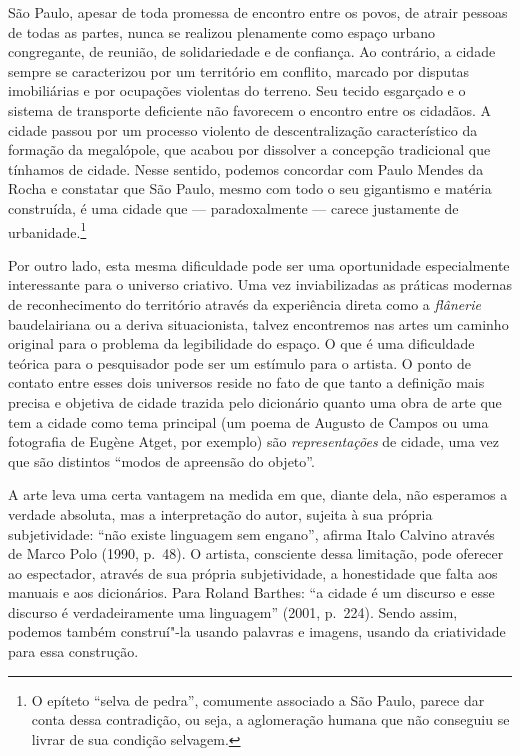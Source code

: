 São Paulo, apesar de toda promessa de encontro entre os povos, de atrair
pessoas de todas as partes, nunca se realizou plenamente como espaço
urbano congregante, de reunião, de solidariedade e de confiança. Ao
contrário, a cidade sempre se caracterizou por um território em
conflito, marcado por disputas imobiliárias e por ocupações violentas do
terreno. Seu tecido esgarçado e o sistema de transporte deficiente não
favorecem o encontro entre os cidadãos. A cidade passou por um processo
violento de descentralização característico da formação da megalópole,
que acabou por dissolver a concepção tradicional que tínhamos de cidade.
Nesse sentido, podemos concordar com Paulo Mendes da Rocha e constatar
que São Paulo, mesmo com todo o seu gigantismo e matéria construída, é
uma cidade que --- paradoxalmente --- carece justamente de
urbanidade.\footnote{O epíteto ``selva de pedra'', comumente associado a
  São Paulo, parece dar conta dessa contradição, ou seja, a aglomeração
  humana que não conseguiu se livrar de sua condição selvagem.}

Por outro lado, esta mesma dificuldade pode ser uma oportunidade
especialmente interessante para o universo criativo. Uma vez
inviabilizadas as práticas modernas de reconhecimento do território
através da experiência direta como a \emph{flânerie} baudelairiana ou a
deriva situacionista, talvez encontremos nas artes um caminho original
para o problema da legibilidade do espaço. O que é uma dificuldade
teórica para o pesquisador pode ser um estímulo para o artista. O ponto
de contato entre esses dois universos reside no fato de que tanto a
definição mais precisa e objetiva de cidade trazida pelo dicionário
quanto uma obra de arte que tem a cidade como tema principal (um poema
de Augusto de Campos ou uma fotografia de Eugène Atget, por exemplo) são
\emph{representações} de cidade, uma vez que são distintos ``modos de
apreensão do objeto''.

A arte leva uma certa vantagem na medida em que, diante dela, não
esperamos a verdade absoluta, mas a interpretação do autor, sujeita à
sua própria subjetividade: ``não existe linguagem sem engano'', afirma
Italo Calvino através de Marco Polo (1990, p.~48). O artista, consciente
dessa limitação, pode oferecer ao espectador, através de sua própria
subjetividade, a honestidade que falta aos manuais e aos dicionários.
Para Roland Barthes: ``a cidade é um discurso e esse discurso é
verdadeiramente uma linguagem'' (2001, p.~224). Sendo assim, podemos
também construí"-la usando palavras e imagens, usando da criatividade
para essa construção.

